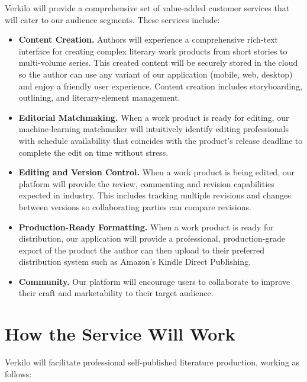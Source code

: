 \documentclass[11pt,openany]{book}
\providecommand{\tightlist}{%
  \setlength{\itemsep}{0pt}\setlength{\parskip}{0pt}}
\begin{document}
Verkilo will provide a comprehensive set of value-added customer
services that will cater to our audience segments. These services
include:

\begin{itemize}
\tightlist
\item
  \textbf{Content Creation.} Authors will experience a comprehensive
  rich-text interface for creating complex literary work products from
  short stories to multi-volume series. This created content will be
  securely stored in the cloud so the author can use any variant of our
  application (mobile, web, desktop) and enjoy a friendly user
  experience. Content creation includes storyboarding, outlining, and
  literary-element management.
\item
  \textbf{Editorial Matchmaking.} When a work product is ready for
  editing, our machine-learning matchmaker will intuitively identify
  editing professionals with schedule availability that coincides with
  the product's release deadline to complete the edit on time without
  stress.
\item
  \textbf{Editing and Version Control.} When a work product is being
  edited, our platform will provide the review, commenting and revision
  capabilities expected in industry. This includes tracking multiple
  revisions and changes between versions so collaborating parties can
  compare revisions.
\item
  \textbf{Production-Ready Formatting.} When a work product is ready for
  distribution, our application will provide a professional,
  production-grade export of the product the author can then upload to
  their preferred distribution system such as Amazon's Kindle Direct
  Publishing.
\item
  \textbf{Community.} Our platform will encourage users to collaborate
  to improve their craft and marketability to their target audience.
\end{itemize}

\hypertarget{how-the-service-will-work}{%
\section{How the Service Will Work}\label{how-the-service-will-work}}

Verkilo will facilitate professional self-published literature
production, working as follows:
\end{document}
